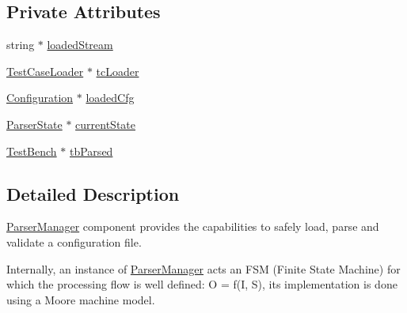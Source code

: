 \subsection*{Private Attributes}
\begin{DoxyCompactItemize}
\item 
string $\ast$ \hyperlink{classit_1_1testbench_1_1parser_1_1ParserManager_aa1e940b6d527d5f8e6f3da64bd5022d9}{loaded\-Stream}
\item 
\hyperlink{classit_1_1testbench_1_1data_1_1TestCaseLoader}{Test\-Case\-Loader} $\ast$ \hyperlink{classit_1_1testbench_1_1parser_1_1ParserManager_aac1d4a536ac5b3d19a970e9692d2ddff}{tc\-Loader}
\item 
\hyperlink{structit_1_1testbench_1_1data_1_1Configuration}{Configuration} $\ast$ \hyperlink{classit_1_1testbench_1_1parser_1_1ParserManager_a8382d999a6d1f2ed096f47c8846b9d49}{loaded\-Cfg}
\item 
\hyperlink{classit_1_1testbench_1_1parser_1_1ParserState}{Parser\-State} $\ast$ \hyperlink{classit_1_1testbench_1_1parser_1_1ParserManager_a2bfc201d0554f851e394e6023e33f748}{current\-State}
\item 
\hyperlink{structit_1_1testbench_1_1data_1_1TestBench}{Test\-Bench} $\ast$ \hyperlink{classit_1_1testbench_1_1parser_1_1ParserManager_a4fde8535856ac3efcf06b06b5de64254}{tb\-Parsed}
\end{DoxyCompactItemize}


\subsection{Detailed Description}
\hyperlink{classit_1_1testbench_1_1parser_1_1ParserManager}{Parser\-Manager} component provides the capabilities to safely load, parse and validate a configuration file.

Internally, an instance of \hyperlink{classit_1_1testbench_1_1parser_1_1ParserManager}{Parser\-Manager} acts an F\-S\-M (Finite State Machine) for which the processing flow is well defined\-: O = f(\-I, S), its implementation is done using a Moore machine model. 

